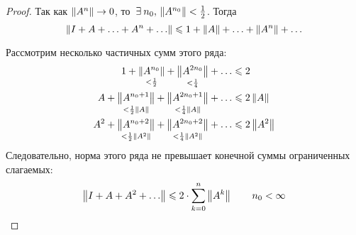 \documentclass[12pt]{article}
\begin{document}
\begin{proof}
		Так как $\left\| A^n \right\| \rightarrow 0$, то $\exists n_0,\,\norm{A^{n_0}} < \frac{1}{2}$. Тогда
		$$\left\| I + A + \ldots + A^n + \ldots \right\| \leqslant 1 + \left\| A \right\| + \ldots + \left\| A^n \right\| + \ldots$$
		
		Рассмотрим несколько частичных сумм этого ряда:
		\begin{align*}
			1 + \underset{< \frac{1}{2}}{\left\| A^{n_0} \right\|} + \underset{< \frac{1}{4}}{\left\| A^{2n_0} \right\|} + \ldots &\leqslant 2 \\
			A + \underset{< \frac{1}{2}\left\| A \right\|}{\left\| A^{n_0+1} \right\|} 
			+ \underset{< \frac{1}{4}\left\| A \right\|}{\left\| A^{2n_0+1} \right\|} + \ldots &\leqslant 2 \left\| A \right\| \\
			A^2 + \underset{< \frac{1}{2}\left\| A^2 \right\|}{\left\| A^{n_0+2} \right\|} 
			+ \underset{< \frac{1}{4}\left\| A^2 \right\|}{\left\| A^{2n_0+2} \right\|} + \ldots &\leqslant 2 \left\| A^2 \right\| \\
		\end{align*}
		Следовательно, норма этого ряда не превышает конечной суммы ограниченных слагаемых:
		$$\left\| I + A + A^2 + \ldots \right\| \leqslant 2\cdot\sum_{k=0}^n\left\| A^k \right\| \qquad n_0 < \infty$$
	\end{proof}
\end{document}

